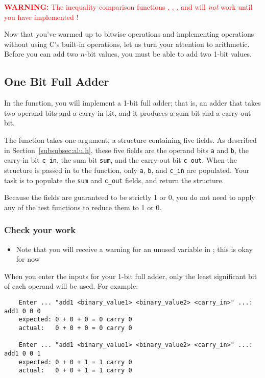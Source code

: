 \textcolor{red}{\textbf{WARNING:} The inequality comparison functions , , , and  will \textit{not} work until you have implemented !}

Now that you've warmed up to bitwise operations and implementing operations without using C's built-in operations, let us turn your attention to arithmetic.
Before you can add two $n$-bit values, you must be able to add two 1-bit values.

\subsection{One Bit Full Adder} \label{subsec:one-bit-full-adder}

In the  function, you will implement a 1-bit full adder;
that is, an adder that takes two operand bits and a carry-in bit, and it produces a sum bit and a carry-out bit.

The function takes one argument, a structure containing five fields.
As described in Section~\ref{subsubsec:alu.h}, these five fields are the operand bits \lstinline{a} and \lstinline{b}, the carry-in bit \lstinline{c_in}, the sum bit \lstinline{sum}, and the carry-out bit \lstinline{c_out}.
When the structure is passed in to the function, only \lstinline{a}, \lstinline{b}, and \lstinline{c_in} are populated.
Your task is to populate the \lstinline{sum} and \lstinline{c_out} fields, and return the structure.

\begin{description}
\end{description}
Because the fields are guaranteed to be strictly 1 or 0, you do not need to apply any of the test functions to reduce them to 1 or 0.

\subsubsection*{Check your work}

\begin{description}
    \begin{itemize}
        \item Note that you will receive a warning for an unused variable in ;
            this is okay for now
    \end{itemize}
\end{description}
When you enter the inputs for your 1-bit full adder, only the least significant bit of each operand will be used.
For example:
\begin{verbatim}
    Enter ... "add1 <binary_value1> <binary_value2> <carry_in>" ...: add1 0 0 0
    expected: 0 + 0 + 0 = 0 carry 0
    actual:   0 + 0 + 0 = 0 carry 0

    Enter ... "add1 <binary_value1> <binary_value2> <carry_in>" ...: add1 0 0 1
    expected: 0 + 0 + 1 = 1 carry 0
    actual:   0 + 0 + 1 = 1 carry 0
\end{verbatim}

